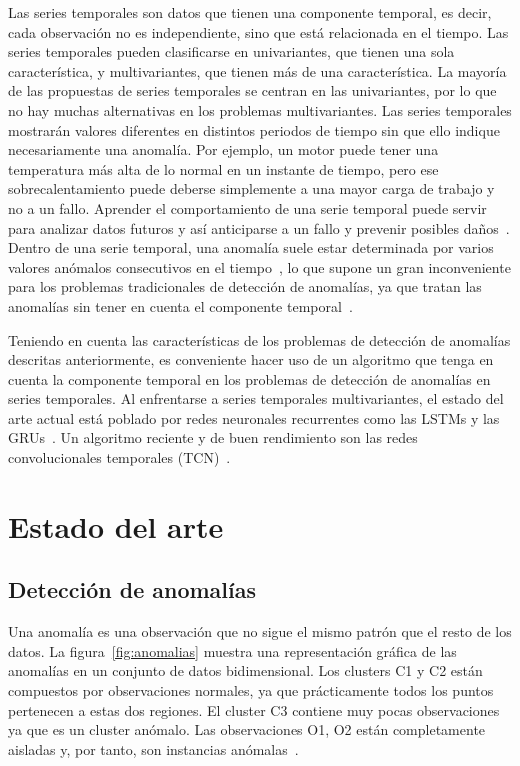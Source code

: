 \documentclass{article}
\begin{document}
	
	Las series temporales son datos que tienen una componente temporal, es decir, cada observación no es independiente, sino que está relacionada en el tiempo. Las series temporales pueden clasificarse en univariantes, que tienen una sola característica, y multivariantes, que tienen más de una característica. La mayoría de las propuestas de series temporales se centran en las univariantes, por lo que no hay muchas alternativas en los problemas multivariantes. Las series temporales mostrarán valores diferentes en distintos periodos de tiempo sin que ello indique necesariamente una anomalía. Por ejemplo, un motor puede tener una temperatura más alta de lo normal en un instante de tiempo, pero ese sobrecalentamiento puede deberse simplemente a una mayor carga de trabajo y no a un fallo. Aprender el comportamiento de una serie temporal puede servir para analizar datos futuros y así anticiparse a un fallo y prevenir posibles daños~\cite{zhang2003time, piccialli20211}. Dentro de una serie temporal, una anomalía suele estar determinada por varios valores anómalos consecutivos en el tiempo~\cite{carrasco2021440}, lo que supone un gran inconveniente para los problemas tradicionales de detección de anomalías, ya que tratan las anomalías sin tener en cuenta el componente temporal~\cite{tatbul2018precision}.
	
	Teniendo en cuenta las características de los problemas de detección de anomalías descritas anteriormente, es conveniente hacer uso de un algoritmo que tenga en cuenta la componente temporal en los problemas de detección de anomalías en series temporales. Al enfrentarse a series temporales multivariantes, el estado del arte actual está poblado por redes neuronales recurrentes como las LSTMs y las GRUs~\cite{bai2018empirical}. Un algoritmo reciente y de buen rendimiento son las redes convolucionales temporales (TCN)~\cite{bai2018empirical, lea2016temporal}.
	
	\section{Estado del arte}
	
	\subsection{Detección de anomalías}
	
	Una anomalía es una observación que no sigue el mismo patrón que el resto de los datos. La figura~\ref{fig:anomalias} muestra una representación gráfica de las anomalías en un conjunto de datos bidimensional. Los clusters C1 y C2 están compuestos por observaciones normales, ya que prácticamente todos los puntos pertenecen a estas dos regiones. El cluster C3 contiene muy pocas observaciones ya que es un cluster anómalo. Las observaciones O1, O2 están completamente aisladas y, por tanto, son instancias anómalas~\cite{chandola2009anomaly}.
	
\end{document}
